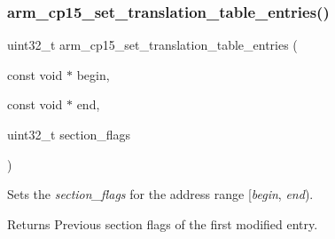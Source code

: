 \subsubsection{\texorpdfstring{arm\_cp15\_set\_translation\_table\_entries()}{arm\_cp15\_set\_translation\_table\_entries()}}
{\footnotesize\ttfamily uint32\+\_\+t arm\+\_\+cp15\+\_\+set\+\_\+translation\+\_\+table\+\_\+entries (\begin{DoxyParamCaption}\item[{const void $\ast$}]{begin,  }\item[{const void $\ast$}]{end,  }\item[{uint32\+\_\+t}]{section\+\_\+flags }\end{DoxyParamCaption})}



Sets the {\itshape section\+\_\+flags} for the address range \mbox{[}{\itshape begin}, {\itshape end}). 

\begin{DoxyReturn}{Returns}
Previous section flags of the first modified entry. 
\end{DoxyReturn}
